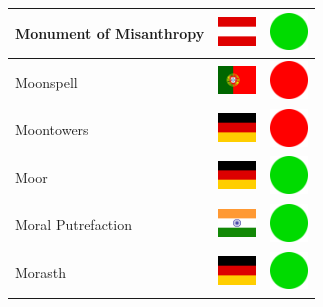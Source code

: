 \documentclass[12pt, a4paper, twoside]{report}
\begin{document}
\begin{center}
\begin{longtable}{|p{5cm}|p{2cm}|p{2cm}|}
 Monument of Misanthropy                                    & \includegraphics[width=1cm]{../img/flags/at} &   \includegraphics[width=1cm]{../likes/y} \\ \hline
 Moonspell                                                  & \includegraphics[width=1cm]{../img/flags/pt} &   \includegraphics[width=1cm]{../likes/n} \\ \hline
 Moontowers                                                 & \includegraphics[width=1cm]{../img/flags/de} &   \includegraphics[width=1cm]{../likes/n} \\ \hline
 Moor                                                       & \includegraphics[width=1cm]{../img/flags/de} &   \includegraphics[width=1cm]{../likes/y} \\ \hline
 Moral Putrefaction                                         & \includegraphics[width=1cm]{../img/flags/in} &   \includegraphics[width=1cm]{../likes/y} \\ \hline
 Morasth                                                    & \includegraphics[width=1cm]{../img/flags/de} &   \includegraphics[width=1cm]{../likes/y} \\ \hline

\end{longtable}
\end{center}
\end{document}
